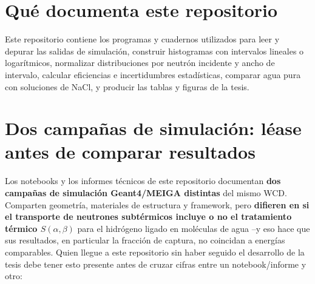 \documentclass[11pt,a4paper]{article}
\newcommand{\archivo}[1]{\path{#1}}
\begin{document}
\begin{abstract}
Este documento introduce, para un lector sin conocimiento previo del desarrollo de la tesis, la existencia de \textbf{dos campañas de simulación Geant4/MEIGA distintas} del detector Cherenkov de agua (WCD) con agua pura y soluciones de NaCl (2.5\,\%, 5\,\%, 10\,\% en masa), documentadas en paralelo en este repositorio. Ambas comparten geometría, materiales de estructura y framework, pero difieren en si el transporte de neutrones subtérmicos incluye o no el tratamiento térmico $S(\alpha,\beta)$ para el hidrógeno ligado en moléculas de agua --y eso hace que sus resultados, en particular la fracción de captura, no coincidan a energías comparables. Cualquier comparación de cifras entre un notebook/informe y otro debe tener esta distinción presente. Este texto corresponde al mismo contenido publicado como introducción en \archivo{analysis/README.md} del repositorio.
\end{abstract}

\tableofcontents

\section{Qué documenta este repositorio}

Este repositorio contiene los programas y cuadernos utilizados para leer y depurar las salidas de simulación, construir histogramas con intervalos lineales o logarítmicos, normalizar distribuciones por neutrón incidente y ancho de intervalo, calcular eficiencias e incertidumbres estadísticas, comparar agua pura con soluciones de NaCl, y producir las tablas y figuras de la tesis.

\section{Dos campañas de simulación: léase antes de comparar resultados}
\label{sec:campanas}

Los notebooks y los informes técnicos de este repositorio documentan \textbf{dos campañas de simulación Geant4/MEIGA distintas} del mismo WCD. Comparten geometría, materiales de estructura y framework, pero \textbf{difieren en si el transporte de neutrones subtérmicos incluye o no el tratamiento térmico $S(\alpha,\beta)$} para el hidrógeno ligado en moléculas de agua --y eso hace que sus resultados, en particular la fracción de captura, no coincidan a energías comparables. Quien llegue a este repositorio sin haber seguido el desarrollo de la tesis debe tener esto presente antes de cruzar cifras entre un notebook/informe y otro:
\end{document}
